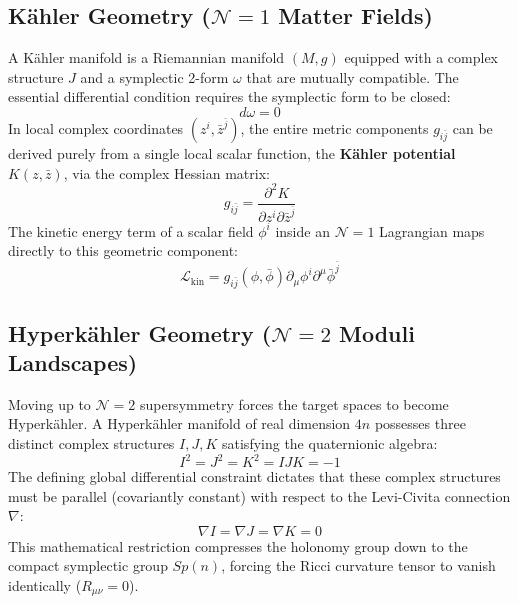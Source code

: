 \documentclass[11pt,a4paper]{article}
\begin{document}
\subsection{K\"ahler Geometry ($\mathcal{N}=1$ Matter Fields)}
A K\"ahler manifold is a Riemannian manifold $(M, g)$ equipped with a complex structure $J$ and a symplectic 2-form $\omega$ that are mutually compatible. The essential differential condition requires the symplectic form to be closed:
\begin{equation}
    d\omega = 0
\end{equation}
In local complex coordinates $(z^i, \bar{z}^{\bar{j}})$, the entire metric components $g_{i\bar{j}}$ can be derived purely from a single local scalar function, the \textbf{K\"ahler potential} $K(z, \bar{z})$, via the complex Hessian matrix:
\begin{equation}
    g_{i\bar{j}} = \frac{\partial^2 K}{\partial z^i \partial \bar{z}^{\bar{j}}}
\end{equation}
The kinetic energy term of a scalar field $\phi^i$ inside an $\mathcal{N}=1$ Lagrangian maps directly to this geometric component:
\begin{equation}
    \mathcal{L}_{\text{kin}} = g_{i\bar{j}}(\phi, \bar{\phi}) \partial_\mu \phi^i \partial^\mu \bar{\phi}^{\bar{j}}
\end{equation}

\subsection{Hyperk\"ahler Geometry ($\mathcal{N}=2$ Moduli Landscapes)}
Moving up to $\mathcal{N}=2$ supersymmetry forces the target spaces to become Hyperk\"ahler. A Hyperk\"ahler manifold of real dimension $4n$ possesses three distinct complex structures $I, J, K$ satisfying the quaternionic algebra:
\begin{equation}
    I^2 = J^2 = K^2 = IJK = -1
\end{equation}
The defining global differential constraint dictates that these complex structures must be parallel (covariantly constant) with respect to the Levi-Civita connection $\nabla$:
\begin{equation}
    \nabla I = \nabla J = \nabla K = 0
\end{equation}
This mathematical restriction compresses the holonomy group down to the compact symplectic group $Sp(n)$, forcing the Ricci curvature tensor to vanish identically ($R_{\mu\nu} = 0$).
\end{document}
